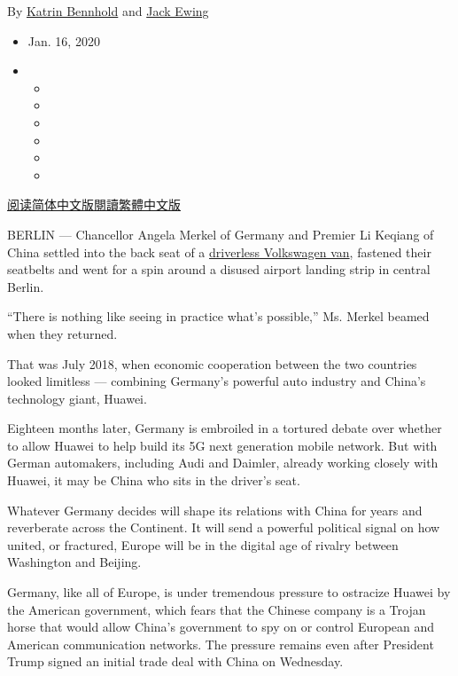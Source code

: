 By \href{https://www.nytimes.com/by/katrin-bennhold}{Katrin Bennhold}
and \href{https://www.nytimes.com/by/jack-ewing}{Jack Ewing}

\begin{itemize}
\item
  Jan. 16, 2020
\item
  \begin{itemize}
  \item
  \item
  \item
  \item
  \item
  \item
  \end{itemize}
\end{itemize}

\href{https://cn.nytimes.com/world/20200117/huawei-germany-china-5g-automakers/}{阅读简体中文版}\href{https://cn.nytimes.com/world/20200117/huawei-germany-china-5g-automakers/zh-hant/}{閱讀繁體中文版}

BERLIN --- Chancellor Angela Merkel of Germany and Premier Li Keqiang of
China settled into the back seat of a
\href{https://www.instagram.com/p/BlDUI7QgqUR/}{driverless Volkswagen
van}, fastened their seatbelts and went for a spin around a disused
airport landing strip in central Berlin.

``There is nothing like seeing in practice what's possible,'' Ms. Merkel
beamed when they returned.

That was July 2018, when economic cooperation between the two countries
looked limitless --- combining Germany's powerful auto industry and
China's technology giant, Huawei.

Eighteen months later, Germany is embroiled in a tortured debate over
whether to allow Huawei to help build its 5G next generation mobile
network. But with German automakers, including Audi and Daimler, already
working closely with Huawei, it may be China who sits in the driver's
seat.

Whatever Germany decides will shape its relations with China for years
and reverberate across the Continent. It will send a powerful political
signal on how united, or fractured, Europe will be in the digital age of
rivalry between Washington and Beijing.

Germany, like all of Europe, is under tremendous pressure to ostracize
Huawei by the American government, which fears that the Chinese company
is a Trojan horse that would allow China's government to spy on or
control European and American communication networks. The pressure
remains even after President Trump signed an initial trade deal with
China on Wednesday.

